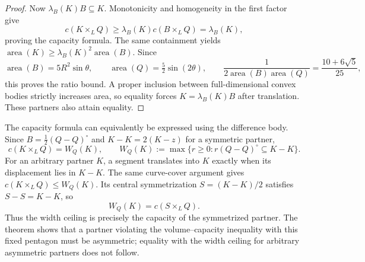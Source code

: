 \begin{proof}
Now $\lambda_B(K)B\subseteq K$. Monotonicity and homogeneity in the first
factor give
\[
 c(K\times_L Q)\ge\lambda_B(K)c(B\times_L Q)=\lambda_B(K),
\]
proving the capacity formula. The same containment yields
$\operatorname{area}(K)\ge\lambda_B(K)^2\operatorname{area}(B)$.
Since
\[
 \operatorname{area}(B)=5R^2\sin\theta,\qquad
 \operatorname{area}(Q)=\tfrac52\sin(2\theta),\qquad
 \frac1{2\operatorname{area}(B)\operatorname{area}(Q)}
 =\frac{10+6\sqrt5}{25},
\]
this proves the ratio bound. A proper inclusion between full-dimensional
convex bodies strictly increases area, so equality forces
$K=\lambda_B(K)B$ after translation. These partners also attain equality.
\end{proof}

The capacity formula can equivalently be expressed using the difference
body. Since $B=\tfrac12(Q-Q)^\circ$ and $K-K=2(K-z)$ for a symmetric
partner,
\[
 c(K\times_L Q)=W_Q(K),\qquad
 W_Q(K):=\max\{r\ge0:r(Q-Q)^\circ\subseteq K-K\}.
\]
For an arbitrary partner $K$, a segment translates into $K$ exactly when
its displacement lies in $K-K$. The same curve-cover argument gives
$c(K\times_L Q)\le W_Q(K)$.
Its central symmetrization $S=(K-K)/2$ satisfies $S-S=K-K$, so
\[
 W_Q(K)=c(S\times_L Q).
\]
Thus the width ceiling is precisely the capacity of the symmetrized
partner. The theorem shows that a partner violating the volume--capacity
inequality with this fixed pentagon must be asymmetric; equality with the
width ceiling for arbitrary asymmetric partners does not follow.
\FloatBarrier
